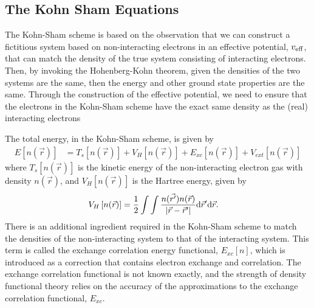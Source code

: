 \documentclass[book.tex]{subfiles}
\begin{document}
\subsection{The Kohn Sham Equations}
The Kohn-Sham scheme is based on the observation that we can construct a fictitious system based on non-interacting electrons in an effective potential, $v_{\rm eff}$, that can match the density of the true system consisting of interacting electrons.  Then, by invoking the Hohenberg-Kohn theorem, given the densities of the two systems are the same, then the energy and other ground state properties are the same.  Through the construction of the effective potential, we need to ensure that the electrons in the Kohn-Sham scheme have the exact same density as the (real) interacting electrons

The total energy, in the Kohn-Sham scheme, is given by\cite{kohnsham:1965}
\begin{align}
E\left[n(\vec{r}) \right] &= T_s\left[n(\vec{r}) \right] +V_{H}\left[n(\vec{r}) \right] +E_{xc}\left[n(\vec{r}) \right] + V_{ext}\left[n(\vec{r}) \right]
\end{align}
where $T_s\left[n(\vec{r}) \right]$ is the kinetic energy of the non-interacting electron gas with density $n(\vec{r})$, and $V_{H}\left[n(\vec{r}) \right]$ is the Hartree energy, given by
\begin{align}
V_{H}\left[n(\vec{r})\right] &= \frac{1}{2} \int \int \frac{ n(\vec{r^{\prime}})n(\vec{r}) }{ \left|\vec{r}-\vec{r}^{\prime}\right| } \textup{d} \vec{r}^{\prime} \textup{d}\vec{r}.
\end{align}
There is an additional ingredient required in the Kohn-Sham scheme to match the densities of the non-interacting system to that of the interacting system.  This term is called the exchange correlation energy functional, $E_{xc}[n]$, which is introduced as a correction that contains electron exchange and correlation. The exchange correlation functional is not known exactly, and the strength of density functional theory relies on the accuracy of the approximations to the exchange correlation functional, $E_{xc}$.
\end{document}
